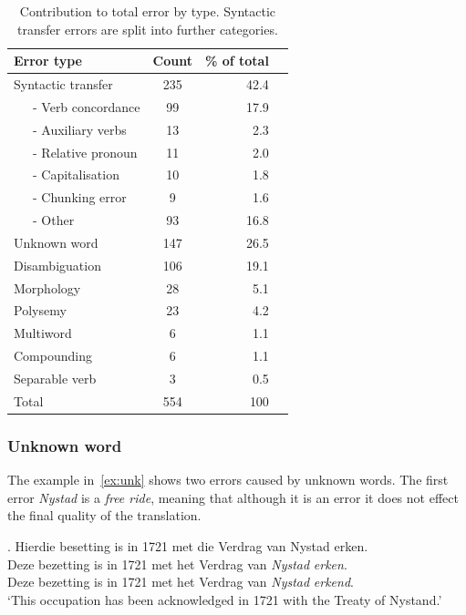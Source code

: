 \documentclass[11pt]{article}
\begin{document}
\begin{table}
  \begin{center}
  \begin{tabular}{|l|c|r|r|}
     \hline
     {\bf Error type}    & {\bf Count} & {\bf \% of total} \\
     \hline
     Syntactic transfer   & 235         & 42.4 \\
     \hline
     ~~~- Verb concordance & 99          & 17.9 \\
     ~~~- Auxiliary verbs & 13          & 2.3 \\ 
     ~~~- Relative pronoun& 11          & 2.0 \\
     ~~~- Capitalisation  & 10          & 1.8 \\
     ~~~- Chunking error  & 9           & 1.6 \\
     ~~~- Other           & 93          & 16.8 \\
     \hline
     Unknown word         & 147         & 26.5 \\
     Disambiguation       & 106         & 19.1 \\
     Morphology           & 28          & 5.1 \\
     Polysemy             & 23          & 4.2 \\
     Multiword            & 6           & 1.1 \\
     Compounding          & 6           & 1.1 \\
     Separable verb       & 3           & 0.5 \\
     \hline
     Total                & 554         & 100 \\
     \hline
  \end{tabular}
    \caption{Contribution to total error by type. Syntactic transfer errors are split into 
      further categories.}
    \label{table:qual}
  \end{center}
\end{table}

\subsubsection{Unknown word}

The example in~\ref{ex:unk} shows two errors caused by unknown words. The first error {\em Nystad} 
is a {\em free ride}, meaning that although it is an error it does not effect the final quality
of the translation. 

\ex. \label{ex:unk} 
    Hierdie besetting is in 1721 met die Verdrag van Nystad erken. \\
    Deze bezetting is in 1721 met het Verdrag van {\em *Nystad} {\em *erken}. \\
    Deze bezetting is in 1721 met het Verdrag van {\em Nystad} {\em erkend}. \\
    `This occupation has been acknowledged in 1721 with the Treaty of Nystand.'
\end{document}
